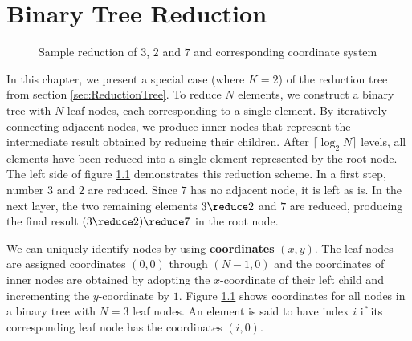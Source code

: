 \chapter{Binary Tree Reduction}
\label{ch:BinaryTreeSummation}

\newcommand{\numLevels}{\lceil \log_2 N \rceil}
\newcommand{\ffs}{\textrm{ffs}}
\newcommand{\nodesum}{\textrm{sum}\,}

\begin{figure}[H]
\centering
{}
\caption{Sample reduction of $3$, $2$ and $7$ and corresponding coordinate system}
\label{fig:coordinateExample}
\end{figure}

In this chapter, we present a special case (where $K = 2$) of the reduction tree from section \ref{sec:ReductionTree}.
To reduce $N$ elements, we construct a binary tree with $N$ leaf nodes,
each corresponding to a single element.
By iteratively connecting adjacent nodes, we produce inner nodes that represent the intermediate result obtained by reducing their children.
After $\numLevels$ levels, all elements have been reduced into a single element represented by the root node.
The left side of figure \ref{fig:coordinateExample} demonstrates this reduction scheme. In a first step, number $3$ and $2$ are reduced.
Since $7$ has no adjacent node, it is left as is. In the next layer, the two remaining elements $3 \reduce 2$ and $7$ are reduced, producing the final
result $(3 \reduce 2) \reduce 7$ in the root node.

We can uniquely identify nodes by using \textbf{coordinates} $(x, y)$. The leaf nodes are assigned coordinates
$(0,0)$ through $(N-1,0)$ and the coordinates of inner nodes are obtained by adopting the $x$-coordinate of their left child and incrementing
the $y$-coordinate by $1$. Figure \ref{fig:coordinateExample} shows coordinates for all nodes in a binary tree with $N = 3$ leaf nodes.
An element is said to have index $i$ if its corresponding leaf node has the coordinates $(i,0)$.

